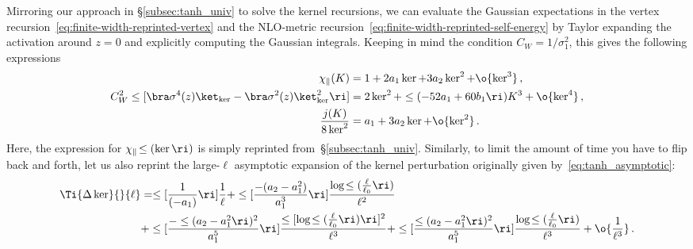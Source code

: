 Mirroring our approach in \S\ref{subsec:tanh_univ} to solve the kernel recursions, we can evaluate the Gaussian expectations in the vertex recursion~\eqref{eq:finite-width-reprinted-vertex} and the NLO-metric recursion~\eqref{eq:finite-width-reprinted-self-energy} by Taylor expanding the activation around $z=0$ and explicitly computing the Gaussian integrals. Keeping in mind the  condition $C_W=1/\sigma_1^2$, this gives the following expressions 
\begin{align}\label{eq:chi-parallel-agebriac}
\chi_{\parallel}(K)&=1+2a_1\ker+3a_2\ker^2+\o{\ker^3}\, ,\\
\label{eq:first-part-of-vertex-algebriac}
C_W^2\le[\bra \sigma^4(z) \ket_{\ker}-\bra \sigma^2(z) \ket_{\ker}^2\ri]&= 2 \ker^2+\le(-52a_1+60b_1\ri)K^3+\o{\ker^4}\, , \\
\label{eq:g4-algebriac-k-star}
\frac{j(K)}{8 \ker^2}&= a_1 +3 a_2 \ker+\o{\ker^2}\, .
\end{align}
Here, the expression for $\chi_{\parallel}\!\le(\ker\ri)$ is simply reprinted from~\S\ref{subsec:tanh_univ}. Similarly, to limit the amount of time you have to flip back and forth, let us also reprint the large-$\ell$ asymptotic expansion of the kernel perturbation originally given by~\eqref{eq:tanh_asymptotic}:
\begin{align}\label{k-star-equals-zero-kernel-solution-reprinted}
\Ti{\Delta \ker}{}{\ell}&=\le[\frac{1}{(-a_1)}\ri]\frac{1}{\ell}+\le[\frac{-(a_2-a_1^2)}{a_1^3}\ri]\frac{\log\!\le(\frac{\ell}{\ell_0}\ri)}{\ell^2}\, \\
&+\le[\frac{-\le(a_2-a_1^2\ri)^2}{a_1^5}\ri]\frac{\le[\log\!\le(\frac{\ell}{\ell_0}\ri)\ri]^2}{\ell^3}+\le[\frac{\le(a_2-a_1^2\ri)^2}{a_1^5}\ri]\frac{\log\!\le(\frac{\ell}{\ell_0}\ri)}{\ell^3}+\o{\frac{1}{\ell^3}}\, .\nonumber
\end{align}

